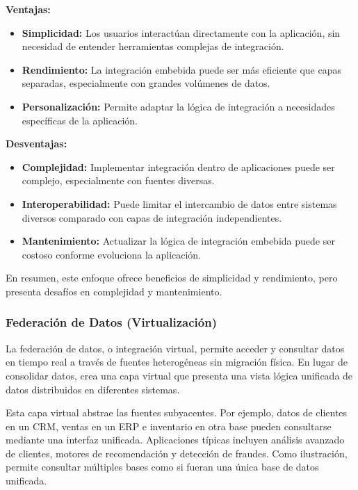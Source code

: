 \documentclass[12pt]{book}
\begin{document}
\textbf{Ventajas:}

\begin{itemize}
    \item \textbf{Simplicidad:} Los usuarios interactúan directamente con la aplicación, sin necesidad de entender herramientas complejas de integración.
    \item \textbf{Rendimiento:} La integración embebida puede ser más eficiente que capas separadas, especialmente con grandes volúmenes de datos.
    \item \textbf{Personalización:} Permite adaptar la lógica de integración a necesidades específicas de la aplicación.
\end{itemize}

\textbf{Desventajas:}

\begin{itemize}
    \item \textbf{Complejidad:} Implementar integración dentro de aplicaciones puede ser complejo, especialmente con fuentes diversas.
    \item \textbf{Interoperabilidad:} Puede limitar el intercambio de datos entre sistemas diversos comparado con capas de integración independientes.
    \item \textbf{Mantenimiento:} Actualizar la lógica de integración embebida puede ser costoso conforme evoluciona la aplicación.
\end{itemize}

En resumen, este enfoque ofrece beneficios de simplicidad y rendimiento, pero presenta desafíos en complejidad y mantenimiento.

\subsubsection{Federación de Datos (Virtualización)}
La federación de datos, o integración virtual, permite acceder y consultar datos en tiempo real a través de fuentes heterogéneas sin migración física. En lugar de consolidar datos, crea una capa virtual que presenta una vista lógica unificada de datos distribuidos en diferentes sistemas.

Esta capa virtual abstrae las fuentes subyacentes. Por ejemplo, datos de clientes en un CRM, ventas en un ERP e inventario en otra base pueden consultarse mediante una interfaz unificada. Aplicaciones típicas incluyen análisis avanzado de clientes, motores de recomendación y detección de fraudes. Como ilustración, permite consultar múltiples bases como si fueran una única base de datos unificada.
\end{document}
